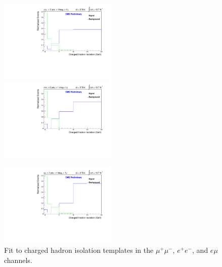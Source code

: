 
\begin{figure}
\includegraphics[width=0.5\textwidth]{Plots/Fits/TTbarPhotonAnalysis/MuMu/central/FitTemplate.pdf}
\includegraphics[width=0.5\textwidth]{Plots/Fits/TTbarPhotonAnalysis/EE/central/FitTemplate.pdf}\\
\begin{center}
\includegraphics[width=0.5\textwidth]{Plots/Fits/TTbarPhotonAnalysis/EMu/central/FitTemplate.pdf}
\end{center}
\caption{Fit to charged hadron isolation templates in the $\mu^{+}\mu^{-}$, $e^{+}e^{-}$, and $e\mu$ channels.}
\label{fig-fitTemplates}
\end{figure}

